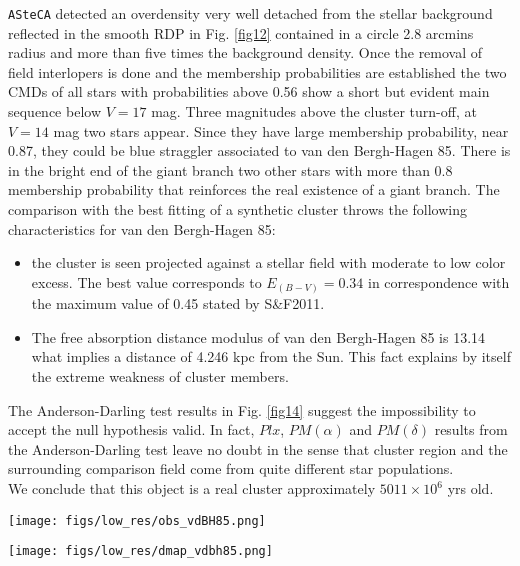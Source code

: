\documentclass{aa}
\begin{document}
\texttt{ASteCA} detected an overdensity very well detached from the stellar
background reflected in the smooth RDP in Fig. \ref{fig12} contained in a circle
2.8 arcmins radius and more than five times the background density. Once the
removal of field interlopers is done and the membership probabilities are
established the two CMDs of all stars with probabilities above 0.56 show a short
but evident main sequence below $V = 17$ mag. Three magnitudes above the cluster
turn-off, at $V = 14$ mag two stars appear. Since they have large membership
probability, near 0.87, they could be blue straggler associated to van den
Bergh-Hagen 85. There is in the bright end of the giant branch two other stars
with more than 0.8 membership probability that reinforces the real existence of
a giant branch. The comparison with the best fitting of a synthetic cluster
throws the following characteristics for van den Bergh-Hagen 85:

\begin{itemize}
\item [a)] the cluster is seen projected against a stellar field with moderate to
    low color excess. The best value corresponds to $E_{(B-V)} = 0.34$ in
    correspondence with the maximum value of 0.45 stated by S\&F2011.
\item [b)] The free absorption distance modulus of van den Bergh-Hagen 85 is
    13.14 what implies a distance of 4.246 kpc from the Sun. This fact explains
    by itself the extreme weakness of cluster members.
\end{itemize}

The Anderson-Darling test results in Fig. \ref{fig14} suggest the impossibility
to accept the null hypothesis valid. In fact, $Plx$, $PM(\alpha)$ and
$PM(\delta)$ results from the Anderson-Darling test leave no doubt in the sense
that cluster region and the surrounding comparison field come from quite
different star populations.\\

We conclude that this object is a real cluster approximately $5011\times10^6$
yrs old.

\begin{figure*}[ht]
    \centering
    \texttt{[image: figs/low\_res/obs\_vdBH85.png]}
    \caption{Idem Fig. \ref{fig3} for van den Bergh-Hagen 85.}
    \label{fig11}
\end{figure*}

\begin{figure*}[ht]
    \centering
    \texttt{[image: figs/low\_res/dmap\_vdbh85.png]}
    \caption{Idem Fig. \ref{fig4} for van den Bergh-Hagen 85.}
    \label{fig12}
\end{figure*}
\end{document}
